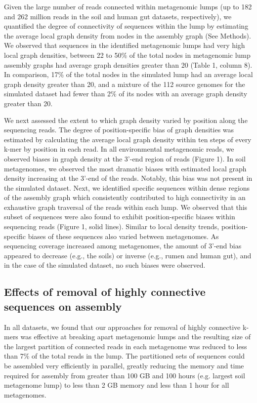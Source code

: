 \documentclass[10pt]{article}
\begin{document}
Given the large number of reads connected within metagenomic lumps (up to 182 and 262 million reads in the soil and human gut datasets, respectively), we quantified the degree of connectivity of sequences within the lump by estimating the average local graph density from nodes in the assembly graph (See Methods).  We observed that sequences in the identified metagenomic lumps had very high local graph densities, between 22 to 50\% of the total nodes in metagenomic lump assembly graphs had average graph densities greater than 20 (Table 1, column 8).  In comparison, 17\% of the total nodes in the simulated lump had an average local graph density greater than 20, and a mixture of the 112 source genomes for the simulated dataset had fewer than 2\% of its nodes with an average graph density greater than 20.  

We next assessed the extent to which graph density varied by position along the sequencing reads.  The degree of position-specific bias of graph densities was estimated by calculating the average local graph density within ten steps of every k-mer by position in each read.  In all environmental metagenomic reads, we observed biases in graph density at the 3'-end region of reads (Figure 1).  In soil metagenomes, we observed the most dramatic biases with estimated local graph density increasing at the 3'-end of the reads.  Notably, this bias was not present in the simulated dataset.  Next, we identified specific sequences within dense regions of the assembly graph which consistently contributed to high connectivity in an exhaustive graph traversal of the reads within each lump.  We observed that this subset of sequences were also found to exhibit position-specific biases within sequencing reads (Figure 1, solid lines).  Similar to local density trends, position-specific biases of these sequences also varied between metagenomes.  As sequencing coverage increased among metagenomes, the amount of 3'-end bias appeared to decrease (e.g., the soils) or inverse (e.g., rumen and human gut), and in the case of the simulated dataset, no such biases were observed.

\subsection*{Effects of removal of highly connective sequences on assembly}

In all datasets, we found that our approaches for removal of highly connective k-mers was effective at breaking apart metagenomic lumps and the resulting size of the largest partition of connected reads in each metagenome was reduced to less than 7\% of the total reads in the lump.  The partitioned sets of sequences could be assembled very efficiently in parallel, greatly reducing the memory and time required for assembly from greater than 100 GB and 100 hours (e.g. largest soil metagenome lump) to less than 2 GB memory  and less than 1 hour for all metagenomes.  
\end{document}
